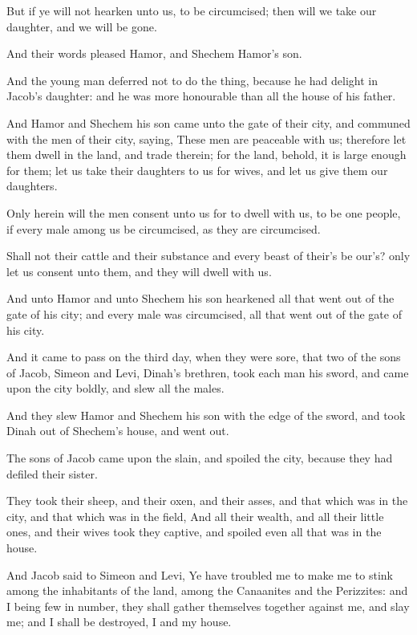 \Verse But if ye will not hearken unto us, to be circumcised; then will we take our daughter, and we will be gone.

\Verse And their words pleased Hamor, and Shechem Hamor's son.

\Verse And the young man deferred not to do the thing, because he had delight in Jacob's daughter: and he was more honourable than all the house of his father.

\Verse And Hamor and Shechem his son came unto the gate of their city, and communed with the men of their city, saying, \Verse These men are peaceable with us; therefore let them dwell in the land, and trade therein; for the land, behold, it is large enough for them; let us take their daughters to us for wives, and let us give them our daughters.

\Verse Only herein will the men consent unto us for to dwell with us, to be one people, if every male among us be circumcised, as they are circumcised.

\Verse Shall not their cattle and their substance and every beast of their's be our's? only let us consent unto them, and they will dwell with us.

\Verse And unto Hamor and unto Shechem his son hearkened all that went out of the gate of his city; and every male was circumcised, all that went out of the gate of his city.

\Verse And it came to pass on the third day, when they were sore, that two of the sons of Jacob, Simeon and Levi, Dinah's brethren, took each man his sword, and came upon the city boldly, and slew all the males.

\Verse And they slew Hamor and Shechem his son with the edge of the sword, and took Dinah out of Shechem's house, and went out.

\Verse The sons of Jacob came upon the slain, and spoiled the city, because they had defiled their sister.

\Verse They took their sheep, and their oxen, and their asses, and that which was in the city, and that which was in the field, \Verse And all their wealth, and all their little ones, and their wives took they captive, and spoiled even all that was in the house.

\Verse And Jacob said to Simeon and Levi, Ye have troubled me to make me to stink among the inhabitants of the land, among the Canaanites and the Perizzites: and I being few in number, they shall gather themselves together against me, and slay me; and I shall be destroyed, I and my house.

